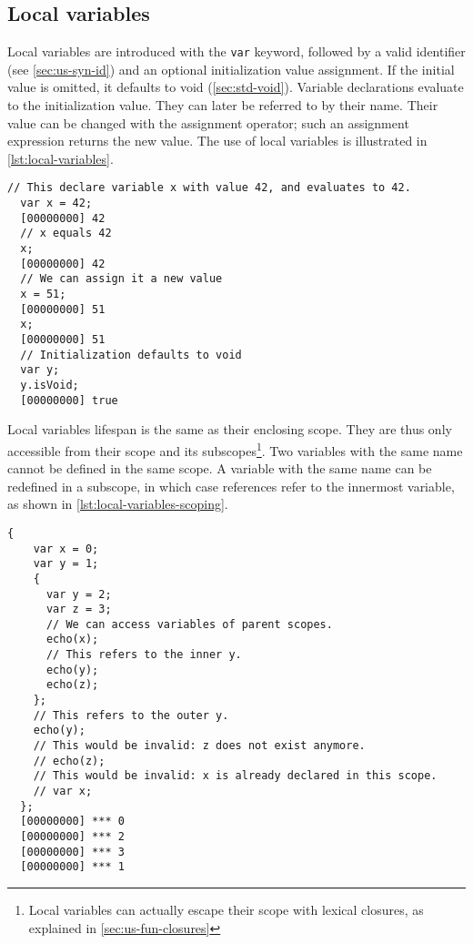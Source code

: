 \documentclass[openright,twoside,12pt]{report}
\begin{document}
\subsection{Local variables}

Local variables are introduced with the \lstinline|var| keyword,
followed by a valid identifier (see \autoref{sec:us-syn-id}) and an optional
initialization value assignment. If the initial value is omitted, it
defaults to void (\autoref{sec:std-void}). Variable declarations evaluate to
the initialization value. They can later be referred to by their
name. Their value can be changed with the assignment operator; such an
assignment expression returns the new value. The use of local
variables is illustrated in \autoref{lst:local-variables}.

\begin{lstlisting}[caption=Using local variables,
  label=lst:local-variables,float=\floatpos]
  // This declare variable x with value 42, and evaluates to 42.
  var x = 42;
  [00000000] 42
  // x equals 42
  x;
  [00000000] 42
  // We can assign it a new value
  x = 51;
  [00000000] 51
  x;
  [00000000] 51
  // Initialization defaults to void
  var y;
  y.isVoid;
  [00000000] true
\end{lstlisting}

Local variables lifespan is the same as their enclosing scope. They
are thus only accessible from their scope and its
subscopes\footnote{Local variables can actually escape their scope
  with lexical closures, as explained in \autoref{sec:us-fun-closures}}. Two
variables with the same name cannot be defined in the same scope. A
variable with the same name can be redefined in a subscope, in which
case references refer to the innermost variable, as shown in
\autoref{lst:local-variables-scoping}.

\begin{lstlisting}[caption=Local variables scoping,
  label=lst:local-variables-scoping,float=\floatpos]
  {
    var x = 0;
    var y = 1;
    {
      var y = 2;
      var z = 3;
      // We can access variables of parent scopes.
      echo(x);
      // This refers to the inner y.
      echo(y);
      echo(z);
    };
    // This refers to the outer y.
    echo(y);
    // This would be invalid: z does not exist anymore.
    // echo(z);
    // This would be invalid: x is already declared in this scope.
    // var x;
  };
  [00000000] *** 0
  [00000000] *** 2
  [00000000] *** 3
  [00000000] *** 1
\end{lstlisting}
\end{document}
